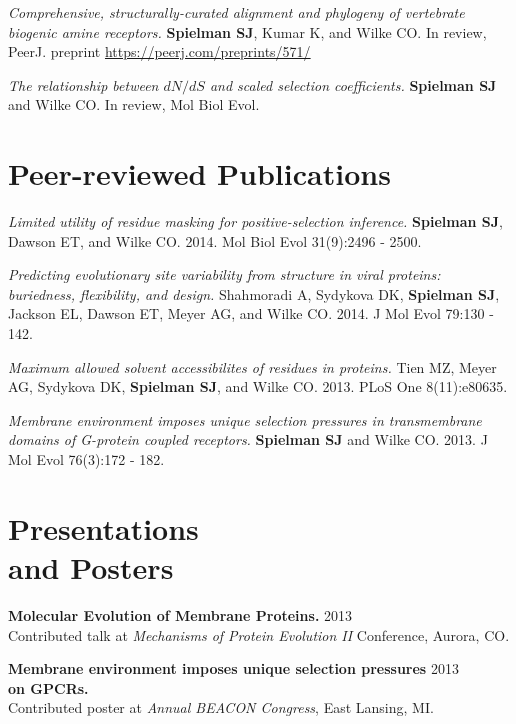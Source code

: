 \documentclass[line, margin]{res}
\begin{document}
\begin{resume}
\emph{Comprehensive, structurally-curated alignment and phylogeny of vertebrate biogenic amine receptors.} \textbf{Spielman SJ}, Kumar K, and Wilke CO. In review, PeerJ. preprint \url{https://peerj.com/preprints/571/}


\emph{The relationship between $dN/dS$ and scaled selection coefficients.} \textbf{Spielman SJ} and Wilke CO. In review, Mol Biol Evol.

\vspace{0.75cm}

\section{Peer-reviewed Publications}

\emph{Limited utility of residue masking for positive-selection inference.} \textbf{Spielman SJ}, Dawson ET, and Wilke CO. 2014. Mol Biol Evol 31(9):2496 - 2500.

\emph{Predicting evolutionary site variability from structure in viral proteins: buriedness, flexibility, and design.} Shahmoradi A, Sydykova DK, \textbf{Spielman SJ}, Jackson EL, Dawson ET, Meyer AG, and Wilke CO. 2014. J Mol Evol 79:130 - 142.

\emph{Maximum allowed solvent accessibilites of residues in proteins.} Tien MZ, Meyer AG, Sydykova DK, \textbf{Spielman SJ}, and Wilke CO. 2013. PLoS One 8(11):e80635.

\emph{Membrane environment imposes unique selection pressures in transmembrane domains of G-protein coupled receptors.} \textbf{Spielman SJ} and Wilke CO. 2013. J Mol Evol 76(3):172 - 182.

\vspace{0.75cm}


\section{Presentations \\ and Posters}

\textbf{Molecular Evolution of Membrane Proteins.} \hfill 2013 \\ Contributed talk at \emph{Mechanisms of Protein Evolution II} Conference, Aurora, CO.

\textbf{Membrane environment imposes unique selection pressures} \hfill 2013 \\ \textbf{on GPCRs.} \\ Contributed poster at \emph{Annual BEACON Congress}, East Lansing, MI.


\end{resume}
\end{document}
